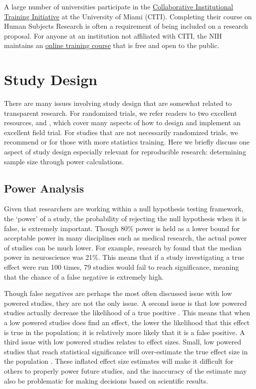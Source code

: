 \documentclass[12pt] {article}
\begin{document}
A large number of universities participate in the \href{https://www.citiprogram.org/}{Collaborative Institutional Training Initiative} at the University of Miami (CITI). Completing their course on Human
Subjects Research is often a requirement of being included on a research
proposal. For anyone at an institution not affiliated with CITI, the NIH maintains an \href{https://phrp.nihtraining.com/users/login.php}{online training course} that is free and open to the public.
\section{Study Design}\label{study-design}
There are many issues involving study design that are somewhat related to transparent research. For randomized trials, we refer readers to two excellent resources, \cite{randomizationtoolkit} and \cite{glennerster_running_2013}, which cover many aspects of how to design and implement an excellent field trial. For studies that are not necessarily randomized trials, we recommend \cite{gertler_impact_2011} or \cite{angrist2008mostly} for those with more statistics training. Here we briefly discuss one aspect of study design especially relevant for reproducible research: determining sample size through power calculations.
  
\subsection{Power Analysis}\label{Conducting Power Analysis}
Given that researchers are working within a null hypothesis testing framework, the ‘power’ 
of a study, the probability of rejecting the null hypothesis when it is false, is extremely 
important. Though 80\% power is held as a lower bound for acceptable power in many disciplines 
such as medical research, the actual power of studies can be much lower. For example, research 
by \cite{button_power_2013} found that the median power in neuroscience was 21\%. This means that 
if a study investigating a true effect were run 100 times, 79 studies would fail to reach significance, 
meaning that the chance of a false negative is extremely high. 

Though false negatives are perhaps the most often discussed issue with low powered studies, they are not the only issue. A second issue is that low powered studies actually decrease the likelihood of a true positive \citep{button_power_2013}. 
This means that when a low powered studies does find an effect, the lower the likelihood that this effect is true in 
the population; it is relatively more likely that it is a false positive.  A third issue with low powered studies relates to effect 
sizes. Small, low powered studies that reach statistical significance will over-estimate the true effect size in the population \citep{button_power_2013}. These inflated effect size estimates will make it difficult for others to properly power future 
studies, and the inaccuracy of the estimate may also be problematic for making decisions based on scientific results. 
 
\end{document}
